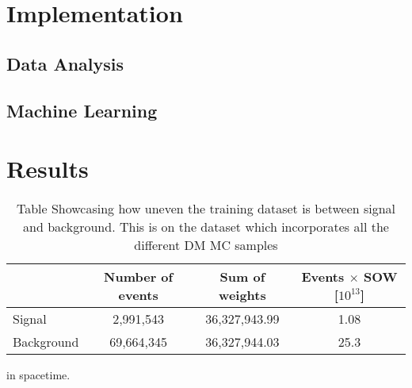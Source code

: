 \documentclass[14pt, a4paper]{book}
\begin{document}
\part{Implementation}
\chapter{Data Analysis}


\chapter{Machine Learning}


\part{Results}

\begin{table}[!h]
    \centering
    \begin{tabular}{l|c|c|c}\midrule\midrule
                    & Number of events & Sum of weights & Events $\times$ SOW [$10^{13}$]\\\midrule
         Signal     & 2,991,543        & 36,327,943.99  & 1.08\\
         Background & 69,664,345       & 36,327,944.03  & 25.3 \\ \midrule\midrule
    \end{tabular}
    \caption[Unbalanced DM training dataset]{Table Showcasing how uneven the training dataset is between signal and background. This is on the dataset which incorporates all the different DM MC samples}
    \label{tab:UnbalancedDMTraining}
\end{table}
in spacetime.

\end{document}
